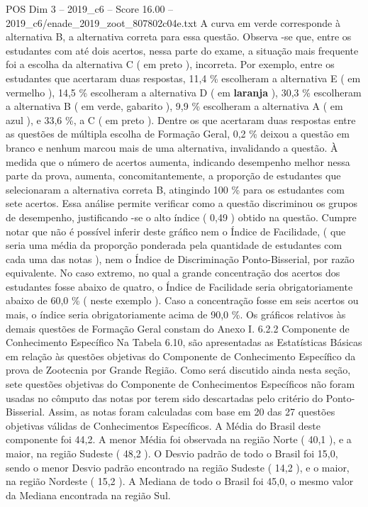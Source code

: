 \begin{textsample}{POS Dim 3 – 2019\_c6 – Score 16.00 – 2019\_c6/enade\_2019\_zoot\_807802c04e.txt}
A curva em verde corresponde à alternativa B, a alternativa correta para essa questão.
Observa -se que, entre os estudantes com até dois acertos, nessa parte do exame, a situação mais frequente foi a escolha da alternativa C ( em preto ), incorreta.
Por exemplo, entre os estudantes que acertaram duas respostas, 11,4 \% escolheram a alternativa E ( em vermelho ), 14,5 \% escolheram a alternativa D ( em \textbf{laranja} ), 30,3 \% escolheram a alternativa B ( em verde, gabarito ), 9,9 \% escolheram a alternativa A ( em azul ), e 33,6 \%, a C ( em preto ).
Dentre os que acertaram duas respostas entre as questões de múltipla escolha de Formação Geral, 0,2 \% deixou a questão em branco e nenhum marcou mais de uma alternativa, invalidando a questão.
À medida que o número de acertos aumenta, indicando desempenho melhor nessa parte da prova, aumenta, concomitantemente, a proporção de estudantes que selecionaram a alternativa correta B, atingindo 100 \% para os estudantes com sete acertos.
Essa análise permite verificar como a questão discriminou os grupos de desempenho, justificando -se o alto índice ( 0,49 ) obtido na questão.
Cumpre notar que não é possível inferir deste gráfico nem o Índice de Facilidade, ( que seria uma média da proporção ponderada pela quantidade de estudantes com cada uma das notas ), nem o Índice de Discriminação Ponto-Bisserial, por razão equivalente.
No caso extremo, no qual a grande concentração dos acertos dos estudantes fosse abaixo de quatro, o Índice de Facilidade seria obrigatoriamente abaixo de 60,0 \% ( neste exemplo ).
Caso a concentração fosse em seis acertos ou mais, o índice seria obrigatoriamente acima de 90,0 \%.
Os gráficos relativos às demais questões de Formação Geral constam do Anexo I. 6.2.2 Componente de Conhecimento Específico Na Tabela 6.10, são apresentadas as Estatísticas Básicas em relação às questões objetivas do Componente de Conhecimento Específico da prova de Zootecnia por Grande Região.
Como será discutido ainda nesta seção, sete questões objetivas do Componente de Conhecimentos Específicos não foram usadas no cômputo das notas por terem sido descartadas pelo critério do Ponto-Bisserial.
Assim, as notas foram calculadas com base em 20 das 27 questões objetivas válidas de Conhecimentos Específicos.
A Média do Brasil deste componente foi 44,2.
A menor Média foi observada na região Norte ( 40,1 ), e a maior, na região Sudeste ( 48,2 ).
O Desvio padrão de todo o Brasil foi 15,0, sendo o menor Desvio padrão encontrado na região Sudeste ( 14,2 ), e o maior, na região Nordeste ( 15,2 ).
A Mediana de todo o Brasil foi 45,0, o mesmo valor da Mediana encontrada na região Sul.

\end{textsample}
